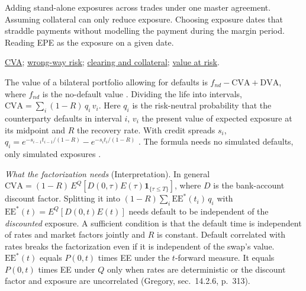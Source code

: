 \begin{qfdefinition}
 Adding stand-alone exposures across trades under one master agreement. Assuming collateral can only reduce exposure. Choosing exposure dates that straddle payments without modelling the payment during the margin period. Reading EPE as the exposure on a given date.

 \hyperref[meth:credit-valuation-adjustment]{CVA}; \hyperref[def:wrong-way-risk]{wrong-way risk}; \hyperref[mech:otc-clearing-collateral]{clearing and collateral}; \hyperref[meth:portfolio-var-methods-decomposition]{value at risk}.

\end{qfdefinition}

\begin{qfmethod}\label{meth:credit-valuation-adjustment}
 The value of a bilateral portfolio allowing for defaults is $f_{nd}-\mathrm{CVA}+\mathrm{DVA}$, where $f_{nd}$ is the no-default value \citep[chap.~9, sec.~9.1, pp.~216--218]{s7-hulloptions}. Dividing the life into intervals, $\mathrm{CVA}=\sum_i(1-R)\,q_i\,v_i$. Here $q_i$ is the risk-neutral probability that the counterparty defaults in interval $i$, $v_i$ the present value of expected exposure at its midpoint and $R$ the recovery rate. With credit spreads $s_i$, $q_i=e^{-s_{i-1}t_{i-1}/(1-R)}-e^{-s_it_i/(1-R)}$ \citep[chap.~18, sec.~18.2, pp.~395--396, eqs.~(18.1)--(18.3)]{risk-management-financial-institutions-2023}. The formula needs no simulated defaults, only simulated exposures \citep[chap.~14, sec.~14.2.3, p.~311]{gregory-xva-challenge-2015}.

\emph{What the factorization needs} (Interpretation). In general $\mathrm{CVA}=(1-R)\,E^Q[D(0,\tau)E(\tau)\mathbf 1_{\{\tau\le T\}}]$, where $D$ is the bank-account discount factor. Splitting it into $(1-R)\sum_i\mathrm{EE}^*(t_i)\,q_i$ with $\mathrm{EE}^*(t)=E^Q[D(0,t)E(t)]$ needs default to be independent of the \emph{discounted} exposure. A sufficient condition is that the default time is independent of rates and market factors jointly and $R$ is constant. Default correlated with rates breaks the factorization even if it is independent of the swap's value. $\mathrm{EE}^*(t)$ equals $P(0,t)$ times EE under the $t$-forward measure. It equals $P(0,t)$ times EE under $Q$ only when rates are deterministic or the discount factor and exposure are uncorrelated (Gregory, sec.~14.2.6, p.~313).


\end{qfmethod}
